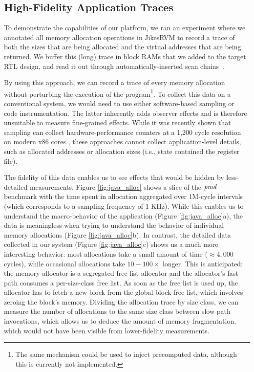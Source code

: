 \subsection{High-Fidelity Application Traces}

To demonstrate the capabilities of our platform, we ran an experiment where we annotated all memory allocation operations in JikesRVM to record a trace of both the sizes that are being allocated and the virtual addresses that are being returned. We buffer this (long) trace in block RAMs that we added to the target RTL design, and read it out through automatically-inserted scan chains~\cite{strober}.

By using this approach, we can record a trace of every memory allocation without perturbing the execution of the program\footnote{The same mechanism could be used to inject precomputed data, although this is currently not implemented.}. To collect this data on a conventional system, we would need to use either software-based sampling or code instrumentation. The latter inherently adds observer effects and is therefore unsuitable to measure fine-grained effects. While it was recently shown that sampling can collect hardware-performance counters at a 1,200 cycle resolution on modern x86 cores \cite{Yang:2015:CPM:2749469.2750401}, these approaches cannot collect application-level details, such as allocated addresses or allocation sizes (i.e., state contained the register file).

The fidelity of this data enables us to see effects that would be hidden by less-detailed measurements. Figure \ref{fig:java_alloc} shows a slice of the $\emph{pmd}$ benchmark with the time spent in allocation aggregated over 1M-cycle intervals (which corresponds to a sampling frequency of 1 KHz). While this enables us to understand the macro-behavior of the application (Figure \ref{fig:java_alloc}a), the data is meaningless when trying to understand the behavior of individual memory allocations (Figure \ref{fig:java_alloc}b). In contrast, the detailed data collected in our system (Figure \ref{fig:java_alloc}c) shows us a much more interesting behavior: most allocations take a small amount of time ($\approx 4,000$ cycles), while occasional allocations take $10-100\times$ longer. This is anticipated: the memory allocator is a segregated free list allocator and the allocator's fast path consumes a per-size-class free list. As soon as the free list is used up, the allocator has to fetch a new block from the global block free list, which involves zeroing the block's memory. Dividing the allocation trace by size class, we can measure the number of allocations to the same size class between slow path invocations, which allows us to deduce the amount of memory fragmentation, which would not have been visible from lower-fidelity measurements.



